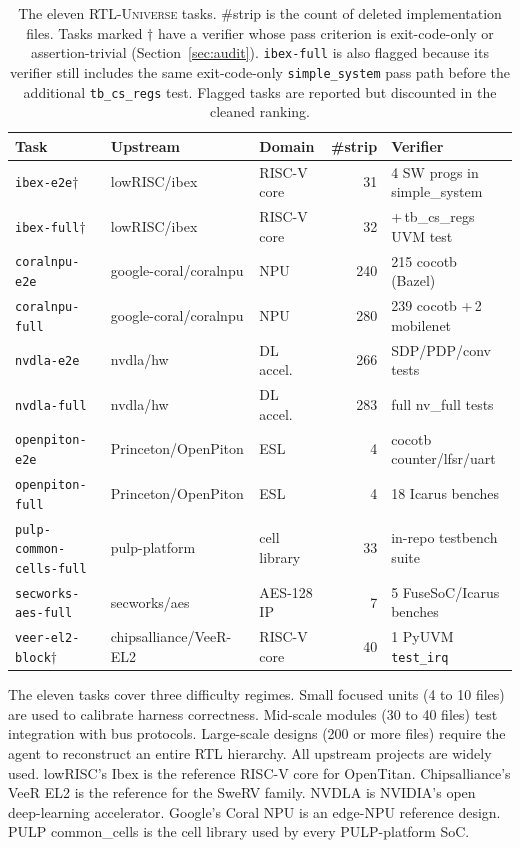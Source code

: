\documentclass{article}
\begin{document}
\begin{table}[t]
\centering
\caption{The eleven \textsc{RTL-Universe} tasks. \#strip is the count of deleted
implementation files. Tasks marked $\dagger$ have a verifier whose pass criterion is
exit-code-only or assertion-trivial (Section~\ref{sec:audit}). \texttt{ibex-full} is also
flagged because its verifier still includes the same exit-code-only \texttt{simple\_system}
pass path before the additional \texttt{tb\_cs\_regs} test. Flagged tasks are reported but
discounted in the cleaned ranking.}
\label{tab:tasks}
\footnotesize
\setlength{\tabcolsep}{3.5pt}
\begin{tabular}{l l l r l}
\toprule
Task & Upstream & Domain & \#strip & Verifier \\
\midrule
\texttt{ibex-e2e}$\dagger$       & lowRISC/ibex          & RISC-V core    & 31  & 4 SW progs in simple\_system \\
\texttt{ibex-full}$\dagger$      & lowRISC/ibex          & RISC-V core    & 32  & +\,tb\_cs\_regs UVM test \\
\texttt{coralnpu-e2e}            & google-coral/coralnpu & NPU            & 240 & 215 cocotb (Bazel) \\
\texttt{coralnpu-full}           & google-coral/coralnpu & NPU            & 280 & 239 cocotb +\,2 mobilenet \\
\texttt{nvdla-e2e}               & nvdla/hw              & DL accel.\     & 266 & SDP/PDP/conv tests \\
\texttt{nvdla-full}              & nvdla/hw              & DL accel.\     & 283 & full nv\_full tests \\
\texttt{openpiton-e2e}           & Princeton/OpenPiton   & ESL            & 4   & cocotb counter/lfsr/uart \\
\texttt{openpiton-full}          & Princeton/OpenPiton   & ESL            & 4   & 18 Icarus benches \\
\texttt{pulp-common-cells-full}  & pulp-platform         & cell library   & 33  & in-repo testbench suite \\
\texttt{secworks-aes-full}       & secworks/aes          & AES-128 IP     & 7   & 5 FuseSoC/Icarus benches \\
\texttt{veer-el2-block}$\dagger$ & chipsalliance/VeeR-EL2 & RISC-V core   & 40  & 1 PyUVM \texttt{test\_irq} \\
\bottomrule
\end{tabular}
\end{table}

The eleven tasks cover three difficulty regimes. Small focused units (4 to 10 files) are used
to calibrate harness correctness. Mid-scale modules (30 to 40 files) test integration with
bus protocols. Large-scale designs (200 or more files) require the agent to reconstruct an
entire RTL hierarchy. All upstream projects are widely used. lowRISC's Ibex is the reference
RISC-V core for OpenTitan. Chipsalliance's VeeR EL2 is the reference for the SweRV family.
NVDLA is NVIDIA's open deep-learning accelerator. Google's Coral NPU is an edge-NPU reference
design. PULP common\_cells is the cell library used by every PULP-platform SoC.
\end{document}
